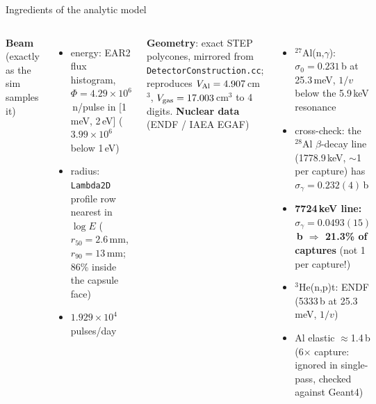\documentclass[aspectratio=169,11pt]{beamer}
\newcommand{\good}[1]{\textcolor{caqua}{#1}}
\begin{document}
\begin{frame}{Ingredients of the analytic model}
  \begin{columns}[T]
    \textbf{Beam} (exactly as the sim samples it)
    \begin{itemize}\small
      \item energy: EAR2 flux histogram,
            $\Phi = 4.29\times10^{6}$\,n/pulse in [1\,meV, 2\,eV]
            ($3.99\times10^{6}$ below 1\,eV)
      \item radius: \texttt{Lambda2D} profile row nearest in $\log E$
            ($r_{50}=2.6$\,mm, $r_{90}=13$\,mm; 86\% inside the capsule face)
      \item $1.929\times10^{4}$ pulses/day
    \end{itemize}
    \smallskip
    \textbf{Geometry}: exact STEP polycones, mirrored from
    \texttt{DetectorConstruction.cc}; reproduces
    $V_{\rm Al}=4.907$\,cm$^{3}$, $V_{\rm gas}=17.003$\,cm$^{3}$ to 4 digits.
    \textbf{Nuclear data} (ENDF / IAEA EGAF)
    \begin{itemize}\small
      \item $^{27}$Al(n,$\gamma$): $\sigma_{0}=0.231$\,b at 25.3\,meV,
            $1/v$ below the 5.9\,keV resonance
      \item cross-check: the $^{28}$Al $\beta$-decay line (1778.9\,keV,
            $\sim$1 per capture) has $\sigma_{\gamma}=0.232(4)$\,b \good{\checkmark}
      \item \textbf{7724\,keV line: $\sigma_{\gamma}=0.0493(15)$\,b
            $\Rightarrow$ 21.3\% of captures} (not 1 per capture!)
      \item $^{3}$He(n,p)t: ENDF (5333\,b at 25.3\,meV, $1/v$)
      \item Al elastic $\approx$1.4\,b (6$\times$ capture: ignored in
            single-pass, checked against Geant4)
    \end{itemize}
  \end{columns}
\end{frame}
\end{document}
